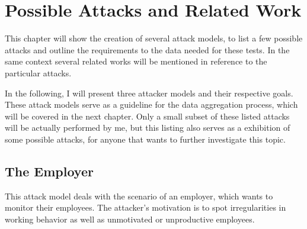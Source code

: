 \chapter{Possible Attacks and Related Work}\label{attack-models}
This chapter will show the creation of several attack models, to list a few possible attacks and outline the requirements to the data needed for these tests.
In the same context several related works will be mentioned in reference to the particular attacks.

In the following, I will present three attacker models and their respective goals.
These attack models serve as a guideline for the data aggregation process, which will be covered in the next chapter.
Only a small subset of these listed attacks will be actually performed by me, but this listing also serves as a exhibition of some possible attacks, for anyone that wants to further investigate this topic.


\section{The Employer}\label{employer-monitoring}
This attack model deals with the scenario of an employer, which wants to monitor their employees.
The attacker's motivation is to spot irregularities in working behavior as well as unmotivated or unproductive employees.

